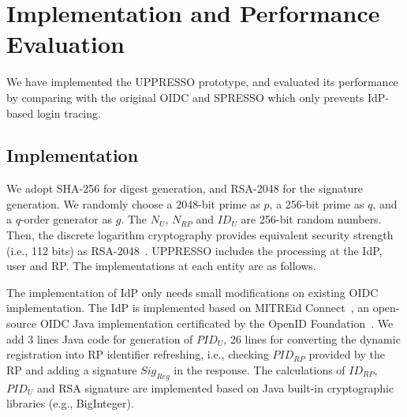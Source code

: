 \section{Implementation and Performance Evaluation}
\label{sec:implementation}
We have implemented the UPPRESSO prototype, and evaluated its performance by comparing with the original OIDC and SPRESSO which only prevents IdP-based login tracing.

\subsection{Implementation}
We adopt SHA-256 for digest generation, and  RSA-2048 for the signature generation. %
We randomly choose a 2048-bit prime as $p$, a 256-bit prime as $q$, and a  $q$-order generator as $g$. The  $N_U$, $N_{RP}$ and $ID_U$  are 256-bit random numbers. Then, the discrete logarithm cryptography  provides equivalent security strength (i.e., 112 bits) as RSA-2048~\cite{barkerecommendation}.
UPPRESSO includes the processing at the IdP, user and RP. The implementations at each entity are as follows.

The implementation of IdP only needs small modifications on existing OIDC implementation. The IdP is implemented based on MITREid Connect~\cite{MITREid}, an open-source OIDC Java implementation certificated by the OpenID Foundation~\cite{OIDF}.
We add 3 lines Java code for generation of $PID_U$, 26 lines for converting the dynamic registration into RP identifier refreshing, i.e., checking $PID_{RP}$ provided by the RP and adding a signature $Sig_{Reg}$ in the response.  %
The calculations of $ID_{RP}$, $PID_U$ and RSA signature are implemented based on Java built-in cryptographic libraries (e.g., BigInteger).

